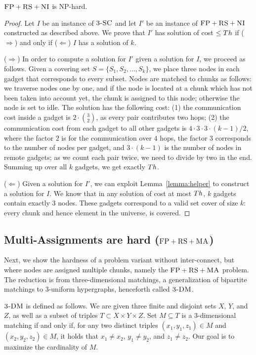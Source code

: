 \begin{theorem}
$\textsc{FP}+\textsc{RS}+\textsc{NI}$ is NP-hard.
\end{theorem}
\begin{proof}
Let $I$ be an instance of $\textsc{3-SC}$ and let $I'$ be an instance of
$\textsc{FP}+\textsc{RS}+\textsc{NI}$ constructed as described above.
We prove that $I'$ has solution of cost $\leq Th$ if ($\Rightarrow$) and only if
($\Leftarrow$)
$I$ has a solution of $k$.

($\Rightarrow$) In order to compute a solution
for $I'$ given a solution for $I$, we proceed as follows.
Given a covering set $S = \{S_1, S_2, \ldots, S_k\}$, we place three nodes in each gadget that
corresponds to every subset. Nodes are matched to chunks 
as follows: we traverse nodes one by one, and if the node is
located at a chunk which has not been taken into account yet,
the chunk is assigned to this node; otherwise 
the node is set to idle. 
The solution has the following cost: 
(1) the communication cost inside a gadget is $2 \cdot {3 \choose 2}$,
  as every pair contributes two hops;
  (2) the communication cost from each gadget to all other gadgets is $4
  \cdot 3 \cdot 3 \cdot (k - 1) / 2$, where the factor $2$ is 
  for the 
  communication over $4$ hops, the factor $3$
  corresponds to the number of nodes per gadget, and 
  $3 \cdot (k-1)$ is the number of nodes in remote gadgets; 
  as we count each pair twice, we need to divide by two in the end.
Summing up over all $k$ gadgets, we get exactly $Th$.

($\Leftarrow$) Given a solution for $I'$,
we can exploit Lemma~\ref{lemma:helper} to construct a solution for $I$.
We know that in any solution of cost at most $Th$,
$k$ gadgets contain exactly 3 nodes. These gadgets correspond to a valid
set cover of size $k$: every
chunk and hence element in the universe, is covered. 
\end{proof}

\subsection{Multi-Assignments are hard ($\textsc{FP}+\textsc{RS}+\textsc{MA}$)}\label{ssec:fprsma}

Next, we show the hardness of a problem variant without inter-connect,
but where nodes are assigned multiple chunks, namely the $\textsc{FP}+\textsc{RS}+\textsc{MA}$
problem.
The reduction is from three-dimensional matchings, a generalization of bipartite matchings
to 3-uniform hypergraphs, henceforth called
$\textsc{3-DM}$.~\cite{3dmatch} 

$\textsc{3-DM}$ is defined as follows. We are given three finite and disjoint sets $X$, $Y$, and $Z$, 
as well as a subset of triples $T\subset X \times Y \times Z$.
Set $M \subseteq T$ is a 3-dimensional matching if and only if, 
for any two distinct triples $(x_1, y_1, z_1) \in M$ and $(x_2, y_2, z_2) \in M$,
it holds that $x_1\neq x_2$, $y_1\neq y_2$, and $z_1\neq z_2$. Our goal is to 
maximize the cardinality of $M$. 


